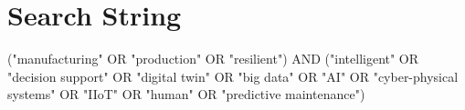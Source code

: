 \section{Search String}

("manufacturing" OR "production" OR "resilient") AND ("intelligent" OR "decision support" OR "digital twin" OR "big data" OR "AI" OR "cyber-physical systems" OR "IIoT" OR "human" OR "predictive maintenance")

